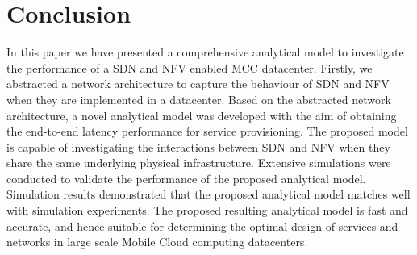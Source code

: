 
\section{Conclusion}
\label{sec:conclusions}

In this paper we have presented a comprehensive analytical model to investigate the performance of a SDN and NFV enabled MCC datacenter. Firstly, we abstracted a network architecture to capture the behaviour of SDN and NFV when they are implemented in a datacenter. Based on the abstracted network architecture, a novel analytical model was developed with the aim of obtaining the end-to-end latency performance for service provisioning. The proposed model is capable of investigating the interactions between SDN and NFV when they share the same underlying physical infrastructure. Extensive simulations were conducted to validate the performance of the proposed analytical model. Simulation results demonstrated that the proposed analytical model matches well with simulation experiments. The proposed resulting analytical model is fast and accurate, and hence suitable for determining the optimal design of services and networks in large scale Mobile Cloud computing datacenters.